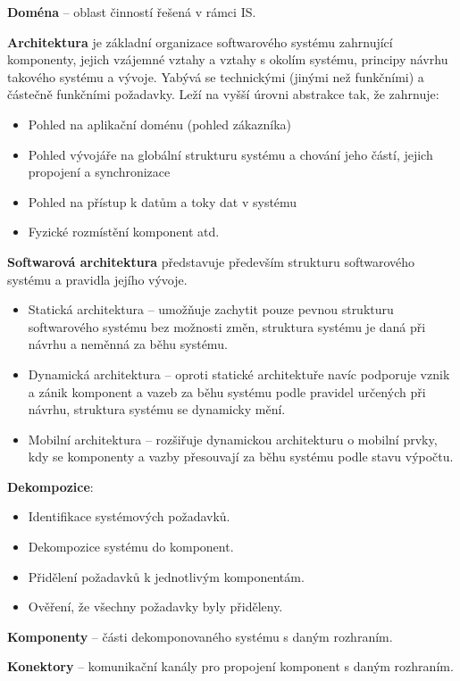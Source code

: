 \textbf{Doména} – oblast činností řešená v rámci IS.

\textbf{Architektura} je základní organizace softwarového systému zahrnující komponenty, jejich vzájemné vztahy a vztahy s okolím systému, principy návrhu takového systému a vývoje. Yabývá se technickými (jinými než funkčními) a částečně funkčními požadavky. Leží na vyšší úrovni abstrakce tak, že zahrnuje:
\begin{itemize}
\item Pohled na aplikační doménu (pohled zákazníka)
\item Pohled vývojáře na globální strukturu systému a chování jeho částí, jejich propojení a synchronizace
\item Pohled na přístup k datům a toky dat v systému
\item Fyzické rozmístění komponent atd.
\end{itemize}

\textbf{Softwarová architektura} představuje především strukturu softwarového systému a pravidla jejího vývoje.
\begin{itemize}
\item Statická architektura -- umožňuje zachytit pouze pevnou strukturu softwarového systému bez možnosti změn, struktura systému je daná při návrhu a neměnná za běhu systému.
\item Dynamická architektura -- oproti statické architektuře navíc podporuje vznik a zánik komponent a vazeb za běhu systému podle pravidel určených při návrhu, struktura systému se dynamicky mění.
\item Mobilní architektura -- rozšiřuje dynamickou architekturu o mobilní prvky, kdy se komponenty a vazby přesouvají za běhu systému podle stavu výpočtu.
\end{itemize}

\textbf{Dekompozice}:
\begin{itemize}
\item Identifikace systémových požadavků.
\item Dekompozice systému do komponent.
\item Přidělení požadavků k jednotlivým komponentám.
\item Ověření, že všechny požadavky byly přiděleny.
\end{itemize}

\textbf{Komponenty} -- části dekomponovaného systému s daným rozhraním.

\textbf{Konektory} -- komunikační kanály pro propojení komponent s daným rozhraním.

